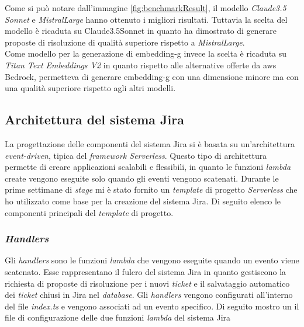 Come si può notare dall'immagine \ref{fig:benchmarkResult}, il modello \textit{Claude3.5 Sonnet} e \textit{MistralLarge} hanno ottenuto i migliori risultati. Tuttavia la scelta del modello è ricaduta su Claude3.5Sonnet in quanto ha dimostrato di generare proposte di risoluzione di qualità superiore rispetto a \textit{MistralLarge}.\\
Come modello per la generazione di \gls{embedding-g} invece la scelta è ricaduta su \textit{Titan Text Embeddings V2} in quanto rispetto alle alternative offerte da \gls{aws} Bedrock, permetteva di generare \gls{embedding-g} con una dimensione minore ma con una qualità superiore rispetto agli altri modelli.

\subsection{Architettura del sistema Jira}
La progettazione delle componenti del sistema Jira si è basata su un'architettura \textit{event-driven}, tipica del \textit{framework Serverless}. Questo tipo di architettura permette di creare applicazioni scalabili e flessibili, in quanto le funzioni \textit{lambda} create vengono eseguite solo quando gli eventi vengono scatenati. 
Durante le prime settimane di \textit{stage} mi è stato fornito un \textit{template} di progetto \textit{Serverless} che ho utilizzato come base per la creazione del sistema Jira. Di seguito elenco le componenti principali del \textit{template} di progetto.

\subsubsection{\textit{Handlers}}
Gli \textit{handlers} sono le funzioni \textit{lambda} che vengono eseguite quando un evento viene scatenato. Esse rappresentano il fulcro del sistema Jira in quanto gestiscono la richiesta di proposte di risoluzione per i nuovi \textit{ticket} e il salvataggio automatico dei \textit{ticket} chiusi in Jira nel \textit{database}. 
Gli \textit{handlers} vengono configurati all'interno del file \textit{index.ts} e vengono associati ad un evento specifico. Di seguito mostro un il file di configurazione delle due funzioni \textit{lambda} del sistema Jira

